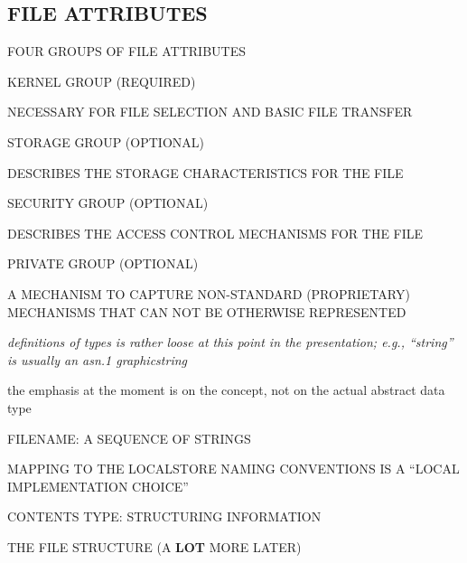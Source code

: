 \begin{bwslide}
\part*	{FILE ATTRIBUTES}\bf

\begin{nrtc}
\item	FOUR GROUPS OF FILE ATTRIBUTES

\item	KERNEL GROUP (REQUIRED)
    \begin{nrtc}
    \item	NECESSARY FOR FILE SELECTION AND BASIC FILE TRANSFER
    \end{nrtc}

\item	STORAGE GROUP (OPTIONAL)
    \begin{nrtc}
    \item	DESCRIBES THE STORAGE CHARACTERISTICS FOR THE FILE
    \end{nrtc}

\item	SECURITY GROUP (OPTIONAL)
    \begin{nrtc}
    \item	DESCRIBES THE ACCESS CONTROL MECHANISMS FOR THE FILE
    \end{nrtc}

\item	PRIVATE GROUP (OPTIONAL)
    \begin{nrtc}
    \item	A MECHANISM TO CAPTURE NON-STANDARD (PROPRIETARY)
		MECHANISMS THAT CAN NOT BE OTHERWISE REPRESENTED
    \end{nrtc}
\end{nrtc}
\end{bwslide}


\begin{note}\em
definitions of types is rather loose at this point in the presentation;
e.g., ``string'' is usually an asn.1 graphicstring

the emphasis at the moment is on the concept,
not on the actual abstract data type
\end{note}


\begin{bwslide}

\begin{nrtc}
\item	FILENAME: A SEQUENCE OF STRINGS
    \begin{nrtc}
    \item	MAPPING TO THE LOCALSTORE NAMING CONVENTIONS IS A
		``LOCAL IMPLEMENTATION CHOICE''
    \end{nrtc}

\item	CONTENTS TYPE: STRUCTURING INFORMATION
    \begin{nrtc}
    \item	THE FILE STRUCTURE (A {\bf LOT} MORE LATER)
    \end{nrtc}
	
\end{nrtc}
\end{bwslide}


